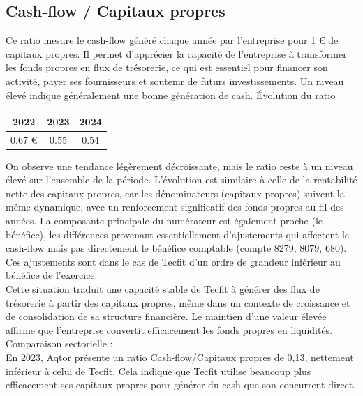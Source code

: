 \subsection{Cash-flow / Capitaux propres}
Ce ratio mesure le cash-flow généré chaque année par l’entreprise pour 1 € de capitaux propres. Il permet d’apprécier la capacité de l’entreprise à transformer les fonds propres en flux de trésorerie, ce qui est essentiel pour financer son activité, payer ses fournisseurs et soutenir de futurs investissements. Un niveau élevé indique généralement une bonne génération de cash.
Évolution du ratio
\begin{table}[h]
\centering
\begin{tabular}{c|c|c}
\textbf{2022} & \textbf{2023} & \textbf{2024} \\
\hline
0.67 € & 0.55 & 0.54 \\
\end{tabular}
\end{table}
On observe une tendance légèrement décroissante, mais le ratio reste à un niveau élevé sur l’ensemble de la période. L’évolution est similaire à celle de la rentabilité nette des capitaux propres, car les dénominateurs (capitaux propres) suivent la même dynamique, avec un renforcement significatif des fonds propres au fil des années. La composante principale du numérateur est également proche (le bénéfice), les différences provenant essentiellement d’ajustements qui affectent le cash-flow mais pas directement le bénéfice comptable (compte 8279, 8079, 680). Ces ajustements sont dans le cas de Tecfit d’un ordre de grandeur inférieur au bénéfice de l’exercice.\\
Cette situation traduit une capacité stable de Tecfit à générer des flux de trésorerie à partir des capitaux propres, même dans un contexte de croissance et de consolidation de sa structure financière. Le maintien d’une valeur élevée affirme que l’entreprise convertit efficacement les fonds propres en liquidités.\\
Comparaison sectorielle :\\
En 2023, Aqtor présente un ratio Cash-flow/Capitaux propres de 0,13, nettement inférieur à celui de Tecfit. Cela indique que Tecfit utilise beaucoup plus efficacement ses capitaux propres pour générer du cash que son concurrent direct. 

